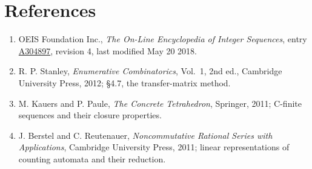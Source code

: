 \documentclass[11pt]{article}
\theoremstyle{definition}
\begin{document}
\section{References}

\begin{enumerate}

\item OEIS Foundation Inc., \emph{The On-Line Encyclopedia of Integer Sequences}, entry \href{https://oeis.org/A304897}{A304897}, revision 4, last modified May 20 2018.

\item R. P. Stanley, \emph{Enumerative Combinatorics}, Vol.~1, 2nd ed., Cambridge University Press, 2012; \S4.7, the transfer-matrix method.

\item M. Kauers and P. Paule, \emph{The Concrete Tetrahedron}, Springer, 2011; C-finite sequences and their closure properties.

\item J. Berstel and C. Reutenauer, \emph{Noncommutative Rational Series with Applications}, Cambridge University Press, 2011; linear representations of counting automata and their reduction.

\end{enumerate}
\end{document}

